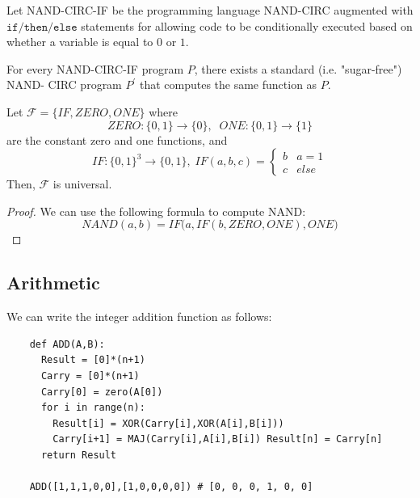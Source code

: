   \begin{definition}
    \label{def:nand-circ-if}
    Let NAND-CIRC-IF be the programming language NAND-CIRC augmented with $\texttt{if/then/else}$ statements for allowing code to be conditionally executed based on whether a variable is equal to $0$ or $1$. 
  \end{definition}

  \begin{theorem}
    \label{thm:removing-syntactic-sugar-from-nand-circ-if}
    For every NAND-CIRC-IF program $P$, there exists a standard (i.e. "sugar-free") NAND- CIRC program $P^\prime$ that computes the same function as $P$. 
  \end{theorem}

  \begin{theorem}
    \label{thm:constant-plus-multiplexor-is-universal}
    Let $\mathcal{F} = \{IF, ZERO, ONE\}$ where 
    \begin{equation}
      ZERO: \{0,1\} \to \{0\}, \;\; ONE: \{0,1\} \to \{1\}
    \end{equation}
    are the constant zero and one functions, and 
    \begin{equation}
      IF: \{0,1\}^3 \to \{0,1\}, \; IF (a, b, c) = \begin{cases}
        b & a = 1 \\
        c & else 
      \end{cases}
    \end{equation}
    Then, $\mathcal{F}$ is universal. 
  \end{theorem}
  \begin{proof}
    We can use the following formula to compute NAND: 
    \begin{equation}
      NAND(a, b) = IF\big( a, IF(b, ZERO, ONE), ONE\big)
    \end{equation}
  \end{proof}

\subsection{Arithmetic}

  We can write the integer addition function as follows: 

  \begin{lstlisting}
    def ADD(A,B):
      Result = [0]*(n+1) 
      Carry = [0]*(n+1) 
      Carry[0] = zero(A[0]) 
      for i in range(n):
        Result[i] = XOR(Carry[i],XOR(A[i],B[i]))
        Carry[i+1] = MAJ(Carry[i],A[i],B[i]) Result[n] = Carry[n]
      return Result
        
    ADD([1,1,1,0,0],[1,0,0,0,0]) # [0, 0, 0, 1, 0, 0]
  \end{lstlisting}

